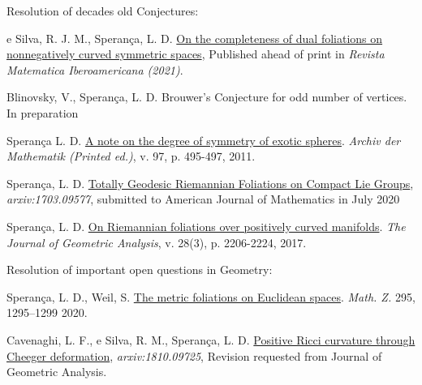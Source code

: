 \documentclass[10pt]{article}
\newenvironment{innerlist}[1][\enskip\textbullet]%
{\begin{compactitem}[#1]}{\end{compactitem}}
\begin{document}
	\begin{enumerate}[$\star$]
		
		
		
  \item 		Resolution of decades old Conjectures:
		\begin{innerlist}[-]
		\item  e Silva, R. J. M., Sperança, L. D. \href{https://ems.press/journals/rmi/articles/1567309}{On the completeness of dual foliations on nonnegatively curved symmetric spaces}, Published ahead of print in \textit{Revista Matematica Iberoamericana (2021)}.


		\item Blinovsky, V., Sperança, L. D.
		Brouwer's Conjecture for odd number of vertices. In preparation


		
					\item Sperança L. D. \href{https://link.springer.com/article/10.1007/s00013-011-0317-3}{A note on the degree of symmetry of exotic spheres}. {\textit{Archiv der Mathematik (Printed ed.)},  v. 97, p. 495-497, 2011}.
		
		
		
		
		\item Sperança, L. D. \href{https://arxiv.org/abs/1703.09577}{Totally Geodesic Riemannian Foliations on Compact Lie Groups}, \textit{{arxiv:1703.09577}}, submitted to  American Journal of Mathematics in July 2020
		
		
		\item Sperança, L. D. \href{https://link.springer.com/article/10.1007/s12220-017-9901-5}{On Riemannian foliations over positively curved manifolds}. {\textit{The Journal of Geometric Analysis}, v. 28(3), p. 2206-2224, 2017}.
		
		\end{innerlist}
		
		
		\item Resolution of important open questions in Geometry:
		\begin{innerlist}[-]
			
		
		\item Sperança, L. D., Weil, S.  \href{https://link.springer.com/article/10.1007/s00209-019-02425-3}{The metric foliations on Euclidean spaces}. \textit{Math. Z.} 295, 1295–1299 2020.
		
		
		\item Cavenaghi, L. F., e Silva, R. M., Sperança, L. D. \href{https://arxiv.org/abs/1810.09725}{Positive Ricci curvature through Cheeger deformation},
		\textit{{arxiv:1810.09725}}, Revision requested from  Journal of Geometric Analysis.
		

\end{innerlist}
\end{enumerate}
\end{document}
